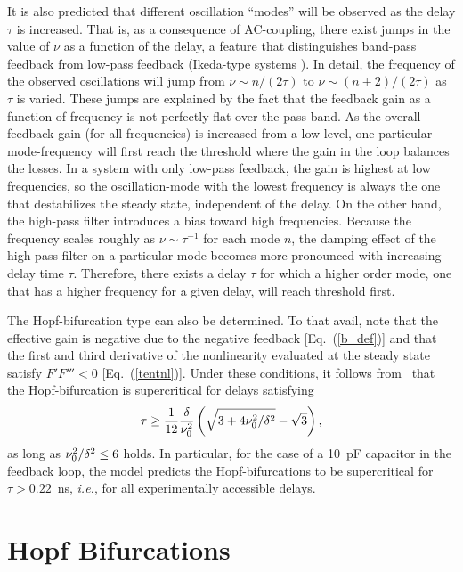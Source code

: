 \documentclass[aps,twocolumn,pre,nofootinbib]{revtex4}
\begin{document}
It is also predicted that different oscillation ``modes'' will be observed as the delay $\tau$ is increased. That is, as a consequence of AC-coupling, there exist jumps in the value of $\nu$ as a function of the delay, a feature that distinguishes band-pass feedback from low-pass feedback (Ikeda-type systems \cite{Ikeda1982}). In detail,
the frequency of the observed oscillations will jump  from $\nu \sim n / (2 \tau)$ to $\nu \sim (n+2) / (2 \tau)$ as $\tau$ is varied.  These jumps are explained by the fact that the feedback gain as a function of frequency  is not perfectly flat over the pass-band.  As the overall feedback gain (for all frequencies)  is increased from a low level, one particular mode-frequency will first reach the threshold where the gain in the loop balances the losses. In a system with only low-pass feedback, the gain is highest at low frequencies, so the oscillation-mode with the lowest frequency is always the one that destabilizes the steady state, independent of the delay. On the other hand, the high-pass filter introduces a bias toward high frequencies. Because the frequency scales roughly as $\nu\sim \tau^{-1}$ for each mode $n$, the damping effect of the high pass filter on a particular mode becomes more pronounced with increasing delay time $\tau$. Therefore, there exists a delay $\tau$ for which a higher order mode, one that has a higher frequency for a given delay, will reach threshold first.


The Hopf-bifurcation type can also be determined. To that avail, note that the effective gain is negative due to the negative feedback [Eq.~(\ref{b_def})]  and that the first and third derivative of the nonlinearity evaluated at the steady state satisfy $F' F''' < 0$ [Eq.~(\ref{tentnl})]. Under these conditions, it follows from~\citet{illing2005,illing2006} that the Hopf-bifurcation is supercritical for delays satisfying
%
%
\begin{equation}
\tau \ge \frac{1}{12} \frac{\delta}{\nu_0^2} \left( \sqrt{ 3+ 4 \nu_0^2/\delta^2 } -\sqrt{3} \right),
\end{equation}
as long as $\nu_0^2/\delta^2 \le 6$ holds.
%
 In particular, for the case of a 10~pF capacitor in the feedback loop, the model predicts the Hopf-bifurcations to be supercritical for  $\tau>0.22$~ns, {\it i.e.}, for all experimentally accessible delays.






\section{Hopf Bifurcations \label{sec:hopf}}
\end{document}
